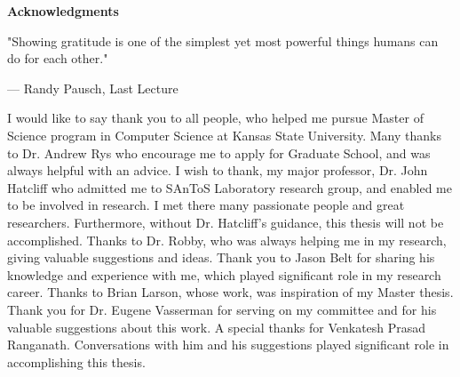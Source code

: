 
\newpage
\vspace*{0.9cm}
\begin{center}
{\bf \Huge Acknowledgments}
\end{center}

\setlength{\baselineskip}{0.8cm}


\setlength{}
\setlength\epigraphrule{0pt}
\makeatletter
{}
\makeatother

\epigraph{"Showing gratitude is one of the simplest yet most powerful things humans can do for each other."}{--- \textup{Randy Pausch}, Last Lecture}


I would like to say thank you to all people, who helped me pursue Master of Science program in Computer Science at Kansas State University. Many thanks to Dr. Andrew Rys who encourage me to apply for Graduate School, and was always helpful with an advice. I wish to thank, my major professor, Dr. John Hatcliff who admitted me to SAnToS Laboratory research group, and enabled me to be involved in research. I met there many passionate people and great researchers. Furthermore, without Dr. Hatcliff's guidance, this thesis will not be accomplished. Thanks to Dr. Robby, who was always helping me in my research, giving valuable suggestions and ideas. Thank you to Jason Belt for sharing his knowledge and experience with me, which played significant role in my research career. Thanks to Brian Larson, whose work, was inspiration of my Master thesis. Thank you for Dr. Eugene Vasserman for serving on my committee and for his valuable suggestions about this work. A special thanks for Venkatesh Prasad Ranganath. Conversations with him and his suggestions played significant role in accomplishing this thesis.
